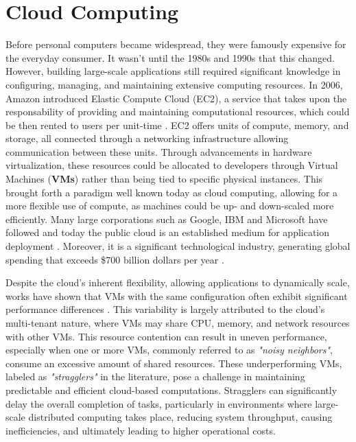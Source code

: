 \section{Cloud Computing}
Before personal computers became widespread, they were famously expensive 
for the everyday consumer. It wasn’t until the 1980s and 1990s 
that this changed. However, building large-scale applications 
still required significant knowledge in configuring, 
managing, and maintaining extensive computing resources.
In 2006, Amazon introduced Elastic Compute Cloud (EC2), 
a service that takes upon the responsability of providing and maintaining computational resources, 
which could be then rented to users per unit-time \cite{amazonEC2}.
EC2 offers units of compute, memory, and storage, 
all connected through a networking infrastructure allowing communication between these units. 
Through advancements in hardware virtualization, these resources could be allocated to 
developers through Virtual Machines (\textbf{VMs}) rather than being tied to specific physical instances.
This brought forth a paradigm well known today as cloud computing,
allowing for a more flexible use of compute, as machines could be up- and down-scaled 
more efficiently.
Many large corporations such as Google, IBM and Microsoft have followed and 
today the public cloud is an established medium for application deployment \cite{googleGCP, ibmCloud, Azure}.
Moreover, it is a significant technological industry, generating global 
spending that exceeds \$700 billion dollars per year \cite{cloudForecast}.

Despite the cloud's inherent flexibility, allowing applications to dynamically scale, 
works have shown that VMs with the same configuration often exhibit 
significant performance differences \cite{vmwareNUMA, longtails}. 
This variability is largely attributed to the cloud’s multi-tenant nature, 
where VMs may share CPU, memory, and network resources with other VMs. 
This resource contention can result in uneven performance, 
especially when one or more VMs, commonly referred to as \textit{"noisy neighbors"}, consume 
an excessive amount of shared resources.
These underperforming VMs, labeled as \textit{"stragglers"} in the literature, 
pose a challenge in maintaining predictable and efficient cloud-based computations. 
Stragglers can significantly delay the overall completion of tasks, particularly in 
environments where large-scale distributed computing takes place, reducing system throughput, 
causing inefficiencies, and ultimately leading to higher operational costs.

